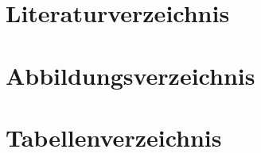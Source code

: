 \documentclass{fhnwreport}
\numberwithin{equation}{section}
\begin{document}
\section{Literaturverzeichnis}
{\def\section*#1{}}
\newpage
\section{Abbildungsverzeichnis}
{\def\section*#1{}\listoffigures{}}
\section{Tabellenverzeichnis}
{\def\section*#1{}\listoftables{}}
%

\end{document}
